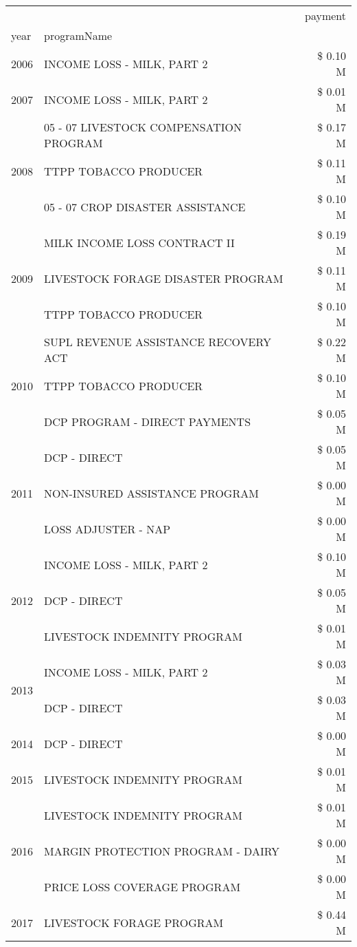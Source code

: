 \begin{tabular}{llr}
\toprule
 &  & payment \\
year & programName &  \\
\midrule
2006 & INCOME LOSS - MILK, PART 2 & \$ 0.10 M \\
\cline{1-3}
2007 & INCOME LOSS - MILK, PART 2 & \$ 0.01 M \\
\cline{1-3}
\multirow[t]{3}{*}{2008} & 05 - 07 LIVESTOCK COMPENSATION PROGRAM & \$ 0.17 M \\
 & TTPP TOBACCO PRODUCER & \$ 0.11 M \\
 & 05 - 07 CROP DISASTER ASSISTANCE & \$ 0.10 M \\
\cline{1-3}
\multirow[t]{3}{*}{2009} & MILK INCOME LOSS CONTRACT II & \$ 0.19 M \\
 & LIVESTOCK FORAGE DISASTER  PROGRAM & \$ 0.11 M \\
 & TTPP TOBACCO PRODUCER & \$ 0.10 M \\
\cline{1-3}
\multirow[t]{3}{*}{2010} & SUPL REVENUE ASSISTANCE RECOVERY ACT & \$ 0.22 M \\
 & TTPP TOBACCO PRODUCER & \$ 0.10 M \\
 & DCP PROGRAM - DIRECT PAYMENTS & \$ 0.05 M \\
\cline{1-3}
\multirow[t]{3}{*}{2011} & DCP - DIRECT & \$ 0.05 M \\
 & NON-INSURED ASSISTANCE PROGRAM & \$ 0.00 M \\
 & LOSS ADJUSTER - NAP & \$ 0.00 M \\
\cline{1-3}
\multirow[t]{3}{*}{2012} & INCOME LOSS - MILK, PART 2 & \$ 0.10 M \\
 & DCP - DIRECT & \$ 0.05 M \\
 & LIVESTOCK INDEMNITY PROGRAM & \$ 0.01 M \\
\cline{1-3}
\multirow[t]{2}{*}{2013} & INCOME LOSS - MILK, PART 2 & \$ 0.03 M \\
 & DCP - DIRECT & \$ 0.03 M \\
\cline{1-3}
2014 & DCP - DIRECT & \$ 0.00 M \\
\cline{1-3}
2015 & LIVESTOCK INDEMNITY PROGRAM & \$ 0.01 M \\
\cline{1-3}
\multirow[t]{3}{*}{2016} & LIVESTOCK INDEMNITY PROGRAM & \$ 0.01 M \\
 & MARGIN PROTECTION PROGRAM - DAIRY & \$ 0.00 M \\
 & PRICE LOSS COVERAGE PROGRAM & \$ 0.00 M \\
\cline{1-3}
\multirow[t]{3}{*}{2017} & LIVESTOCK FORAGE PROGRAM & \$ 0.44 M \\

\end{tabular}
